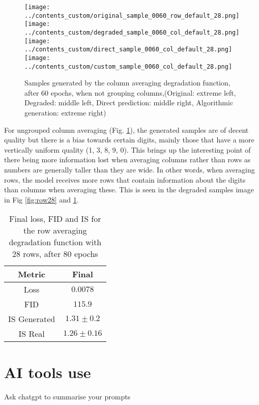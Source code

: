 \documentclass[12pt]{report} %
\begin{document}
\newpage

\begin{figure}[h]
  \centering
  \texttt{[image: ../contents\_custom/original\_sample\_0060\_row\_default\_28.png]}
  \texttt{[image: ../contents\_custom/degraded\_sample\_0060\_col\_default\_28.png]}
  \texttt{[image: ../contents\_custom/direct\_sample\_0060\_col\_default\_28.png]}
  \texttt{[image: ../contents\_custom/custom\_sample\_0060\_col\_default\_28.png]}
  \captionsetup{font=footnotesize}
  \caption{Samples generated by the column averaging degradation function, after 60 epochs, when not grouping columns,(Original: extreme left, Degraded: middle left, Direct prediction: middle right, Algorithmic generation: extreme right)}
  \label{fig:col28}
\end{figure}

For ungrouped column averaging (Fig. \ref{fig:col28}), the generated samples are of decent quality but there is a bias towards certain digits, mainly those that have a more vertically uniform quality (1, 3, 8, 9, 0). This brings up the interesting point of there being more information lost when averaging columns rather than rows as numbers are generally taller than they are wide. In other words, when averaging rows, the model receives more rows that contain information about the digits than columns when averaging these. This is seen in the degraded samples image in Fig \ref{fig:row28} and \ref{fig:col28}.

\begin{table}
  \centering
  \begin{tabular}{c c}
    \hline
    Metric & Final \\
    \hline
    Loss & $0.0078$ \\
    FID & $115.9$ \\
    IS Generated & $1.31 \pm 0.2$ \\
    IS Real & $1.26 \pm 0.16$ \\
    \hline
  \end{tabular}
  \captionsetup{font=footnotesize}
  \caption{Final loss, FID and IS for the row averaging degradation function with 28 rows, after 80 epochs}
  \label{tab:row28}
\end{table}

\newpage

\section{AI tools use}

Ask chatgpt to summarise your prompts







\end{document}
